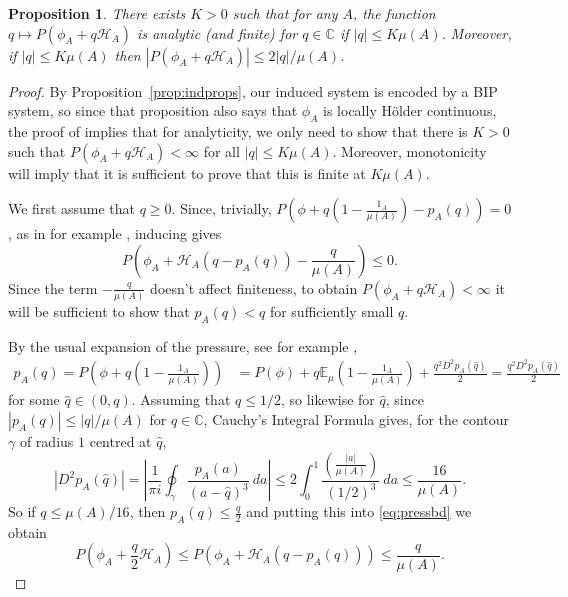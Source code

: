 \documentclass[11pt, reqno]{amsart}
\numberwithin{equation}{section}
\theoremstyle{plain}%
\newtheorem{prop}[thm]{Proposition}
\theoremstyle{definition}
\def\E{\mathbb E}
\renewcommand{\H}{\mathcal{H}}
\theoremstyle{nonumberplain}
\begin{document}
\begin{prop}
There exists $K>0$ such that for any $A$, the function $q\mapsto P(\phi_A+q\H_A)$ is analytic (and finite) for $q\in \mathbb{C}$ if $|q|\le K\mu(A)$.
Moreover, if $|q|\le K\mu(A)$ then $\left|P(\phi_A+q\H_A)\right| \le 2|q|/\mu(A)$.
\label{prop:ana}
 \end{prop}
 
\begin{proof}
By Proposition~\ref{prop:indprops}, our induced system is encoded by a BIP system, so since that proposition also says that $\phi_A$ is locally H\"older continuous,  the proof of \cite[Corollary 4]{Sar03} implies that for analyticity, we only need to show that there is $K>0$ such that $P(\phi_A+q\H_A)<\infty$ for all $|q|\le K\mu(A)$.  Moreover, monotonicity will imply that it is sufficient to prove that this is finite at $K\mu(A)$.

We first assume that $q\ge 0$.
Since, trivially, $P\left(\phi+q\left(1-\frac{1_A}{\mu(A)}\right) - p_A(q) \right)=0$, as in for example \cite[Lemma 4.1]{IomTod10}, inducing gives 
\begin{equation}
P\left(\phi_A+\H_A\left(q - p_A(q)\right)- \frac{q}{\mu(A)} \right)\le 0.
\label{eq:pressbd}
\end{equation}
Since the term $- \frac{q}{\mu(A)}$ doesn't affect finiteness, to obtain $P(\phi_A+q\H_A)<\infty$ it will be sufficient to show that $p_A(q) <q$ for sufficiently small $q$.

By the usual expansion of the pressure, see for example  \cite[Chapter 4]{ParPol90}, 
\begin{align*}
p_A(q) = P\left(\phi+q\left(1-\frac{1_A}{\mu(A)}\right)\right) &  = P(\phi)+ q \E_{\mu}\left(1-\frac{1_A}{\mu(A)}\right) + \frac{q^2D^2p_A(\hat q)}2 =  \frac{q^2D^2p_A(\hat q)}2 
\end{align*}
for some $\hat q\in (0, q)$.  Assuming that $q\le 1/2$, so likewise for $\hat q$, since  $|p_A(q)| \le |q|/\mu(A)$ for $q\in \mathbb{C}$, Cauchy's Integral Formula gives, for the contour $\gamma$ of radius $1$ centred at $\hat q$,
$$|D^2p_A(\hat q)|= \left|\frac{1}{\pi i}\oint_\gamma\frac{p_A(a)}{(a-\hat q)^3}~da\right| \le  2\int_0^1\frac{\left(\frac{|a|}{\mu(A)}\right)}{(1/2)^3}~da \le  \frac{16}{\mu(A)}.$$
So if $q\le  \mu(A)/16$, then $p_A(q)\le \frac q2$ and putting this into \eqref{eq:pressbd} we obtain
\begin{equation}
P\left(\phi_A+\frac{q}2\H_A \right) \le P\left(\phi_A+\H_A\left(q - p_A(q) \right) \right)\le  \frac{q}{\mu(A)}.
\label{eq:pressbd2}
\end{equation}


\end{proof}
\end{document}
